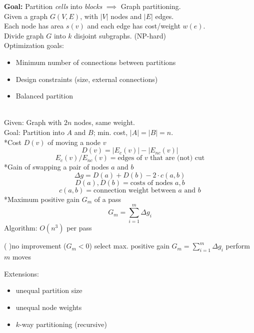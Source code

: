 
\textbf{Goal:} Partition \emph{cells} into \emph{blocks} $\implies$ Graph
partitioning.\\
Given a graph $G(V,E)$, with $|V|$ nodes and $|E|$ edges.\\
Each node has area $s(v)$ and each edge has cost/weight $w(e)$.\\
Divide graph $G$ into $k$ disjoint subgraphs. (NP-hard)\\
Optimization goals:
\begin{itemize}
  \item Minimum number of connections between partitions
  \item Design constraints (size, external connections)
  \item Balanced partition
\end{itemize}

 \\
Given: Graph with $2n$ nodes, same weight. \\
Goal: Partition into $A$ and $B$; min. cost, $|A|=|B|=n$.\\
*Cost $D(v)$ of moving a node $v$
$$D(v)=|E_c(v)|-|E_{nc}(v)|$$
$$ E_c(v)/E_{nc}(v) = \text{edges of $v$ that are (not) cut} $$
*Gain of swapping a pair of nodes $a$ and $b$
$$ \Delta g = D(a) + D(b) - 2 \cdot c(a,b) $$
$$ D(a),D(b) = \text{costs of nodes $a,b$} $$
$$ c(a,b) = \text{connection weight between $a$ and $b$} $$
*Maximum positive gain $G_m$ of a pass
$$ G_m = \sum_{i=1}^{m} \Delta g_i $$
Algorithm: $O(n^3)$ per pass\\
\begin{algorithm}[H]
\Repeat( ){no improvement ($G_m < 0$)}{
  select max. positive gain $G_m = \sum_{i=1}^{m} \Delta g_i$\;
  perform $m$ moves\;
}
\end{algorithm}
Extensions:
\begin{itemize}
  \item unequal partition size
  \item unequal node weights
  \item $k$-way partitioning (recursive)
\end{itemize}

